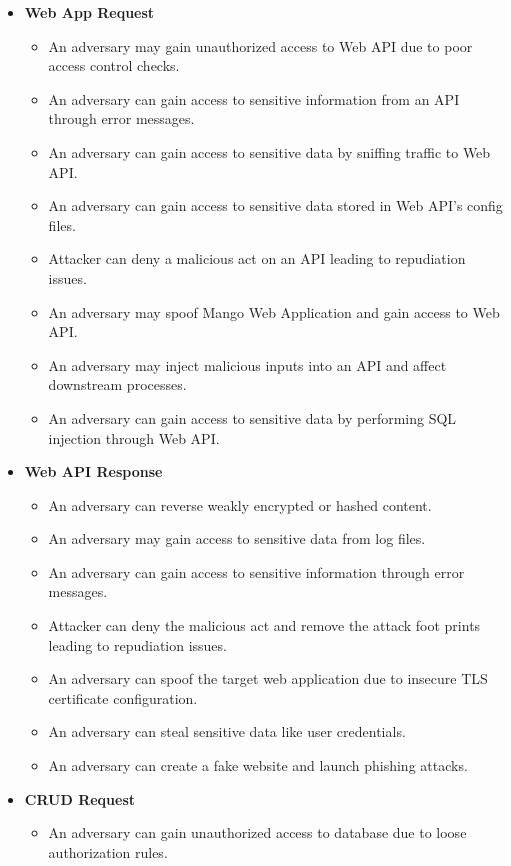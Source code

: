 \begin{itemize}
    \item \textbf{Web App Request}
    \begin{itemize}
        \item An adversary may gain unauthorized access to Web API due to poor access control checks.
        \item An adversary can gain access to sensitive information from an API through error messages.
        \item An adversary can gain access to sensitive data by sniffing traffic to Web API.
        \item An adversary can gain access to sensitive data stored in Web API's config files.
        \item Attacker can deny a malicious act on an API leading to repudiation issues.
        \item An adversary may spoof Mango Web Application and gain access to Web API.
        \item An adversary may inject malicious inputs into an API and affect downstream processes.
        \item An adversary can gain access to sensitive data by performing SQL injection through Web API\@.
    \end{itemize}
    \item \textbf{Web API Response}
    \begin{itemize}
        \item An adversary can reverse weakly encrypted or hashed content.
        \item An adversary may gain access to sensitive data from log files.
        \item An adversary can gain access to sensitive information through error messages.
        \item Attacker can deny the malicious act and remove the attack foot prints leading to repudiation issues.
        \item An adversary can spoof the target web application due to insecure TLS certificate configuration.
        \item An adversary can steal sensitive data like user credentials.
        \item An adversary can create a fake website and launch phishing attacks.
    \end{itemize}
    \item \textbf{CRUD Request}
    \begin{itemize}
        \item An adversary can gain unauthorized access to database due to loose authorization rules.

\end{itemize}
\end{itemize}

